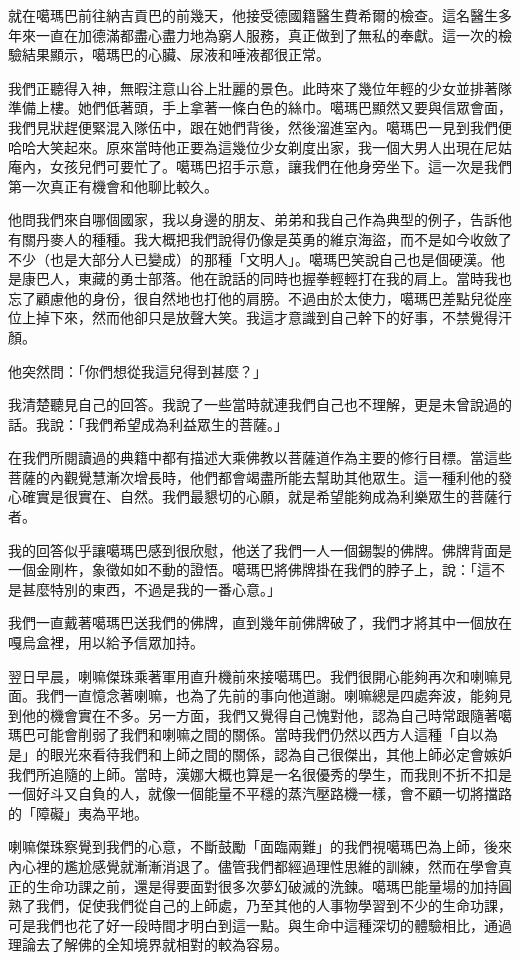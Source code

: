 就在噶瑪巴前往納吉貢巴的前幾天，他接受德國籍醫生費希爾的檢查。這名醫生多年來一直在加德滿都盡心盡力地為窮人服務，真正做到了無私的奉獻。這一次的檢驗結果顯示，噶瑪巴的心臟、尿液和唾液都很正常。

我們正聽得入神，無暇注意山谷上壯麗的景色。此時來了幾位年輕的少女並排著隊準備上樓。她們低著頭，手上拿著一條白色的絲巾。噶瑪巴顯然又要與信眾會面，我們見狀趕便緊混入隊伍中，跟在她們背後，然後溜進室內。噶瑪巴一見到我們便哈哈大笑起來。原來當時他正要為這幾位少女剃度出家，我一個大男人出現在尼姑庵內，女孩兒們可要忙了。噶瑪巴招手示意，讓我們在他身旁坐下。這一次是我們第一次真正有機會和他聊比較久。

他問我們來自哪個國家，我以身邊的朋友、弟弟和我自己作為典型的例子，告訴他有關丹麥人的種種。我大概把我們說得仍像是英勇的維京海盜，而不是如今收斂了不少（也是大部分人已變成）的那種「文明人」。噶瑪巴笑說自己也是個硬漢。他是康巴人，東藏的勇士部落。他在說話的同時也握拳輕輕打在我的肩上。當時我也忘了顧慮他的身份，很自然地也打他的肩膀。不過由於太使力，噶瑪巴差點兒從座位上掉下來，然而他卻只是放聲大笑。我這才意識到自己幹下的好事，不禁覺得汗顏。

他突然問：「你們想從我這兒得到甚麼？」

我清楚聽見自己的回答。我說了一些當時就連我們自己也不理解，更是未曾說過的話。我說：「我們希望成為利益眾生的菩薩。」

在我們所閱讀過的典籍中都有描述大乘佛教以菩薩道作為主要的修行目標。當這些菩薩的內觀覺慧漸次增長時，他們都會竭盡所能去幫助其他眾生。這一種利他的發心確實是很實在、自然。我們最懇切的心願，就是希望能夠成為利樂眾生的菩薩行者。

我的回答似乎讓噶瑪巴感到很欣慰，他送了我們一人一個錫製的佛牌。佛牌背面是一個金剛杵，象徵如如不動的證悟。噶瑪巴將佛牌掛在我們的脖子上，說：「這不是甚麼特別的東西，不過是我的一番心意。」

我們一直戴著噶瑪巴送我們的佛牌，直到幾年前佛牌破了，我們才將其中一個放在嘎烏盒裡，用以給予信眾加持。

翌日早晨，喇嘛傑珠乘著軍用直升機前來接噶瑪巴。我們很開心能夠再次和喇嘛見面。我們一直憶念著喇嘛，也為了先前的事向他道謝。喇嘛總是四處奔波，能夠見到他的機會實在不多。另一方面，我們又覺得自己愧對他，認為自己時常跟隨著噶瑪巴可能會削弱了我們和喇嘛之間的關係。當時我們仍然以西方人這種「自以為是」的眼光來看待我們和上師之間的關係，認為自己很傑出，其他上師必定會嫉妒我們所追隨的上師。當時，漢娜大概也算是一名很優秀的學生，而我則不折不扣是一個好斗又自負的人，就像一個能量不平穩的蒸汽壓路機一樣，會不顧一切將擋路的「障礙」夷為平地。

喇嘛傑珠察覺到我們的心意，不斷鼓勵「面臨兩難」的我們視噶瑪巴為上師，後來內心裡的尷尬感覺就漸漸消退了。儘管我們都經過理性思維的訓練，然而在學會真正的生命功課之前，還是得要面對很多次夢幻破滅的洗鍊。噶瑪巴能量場的加持圓熟了我們，促使我們從自己的上師處，乃至其他的人事物學習到不少的生命功課，可是我們也花了好一段時間才明白到這一點。與生命中這種深切的體驗相比，通過理論去了解佛的全知境界就相對的較為容易。

